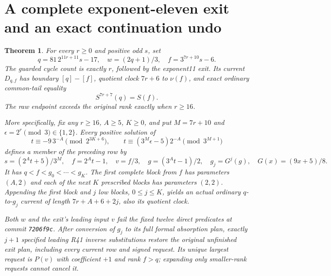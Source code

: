 \documentclass[11pt]{article}
\newtheorem{theorem}{Theorem}
\begin{document}
\section{A complete exponent-eleven exit and an exact continuation undo}
\begin{theorem}\label{thm:elevenexitundo}
For every $r\ge0$ and positive odd $s$, set
\[
 q=81\,2^{11r+11}s-17,\quad w=(2q+1)/3,
 \quad f=3^{7r+10}s-6.
\]
The guarded cycle count is exactly $r$, followed by the exponent11
exit. Its current $D_{q,f}$ has boundary $[q]-[f]$, quotient clock
$7r+6$ to $\nu(f)$, and exact ordinary common-tail equality
\[
 S^{7r+7}(q)=S(f).
\]
The raw endpoint exceeds the original rank exactly when $r\ge16$.

More specifically, fix any $r\ge16$, $A\ge5$, $K\ge0$, and
put $M=7r+10$ and $\epsilon=2^r\pmod3\in\{1,2\}$.
Every positive solution of
\[
 t\equiv-9\,3^{-A}\pmod{2^{3K+6}},\qquad
 t\equiv(3^M\epsilon-5)2^{-A}\pmod{3^{M+1}}
\]
defines a member of the preceding row by
\[
 s=(2^At+5)/3^M,\quad f=2^At-1,\quad v=f/3,
 \quad g=(3^At-1)/2,\quad g_j=G^j(g),\quad G(x)=(9x+5)/8.
\]
It has $q<f<g_0<\cdots<g_K$. The first complete block from $f$
has parameters $(A,2)$ and each of the next $K$ prescribed blocks
has parameters $(2,2)$. Appending the first block and $j$ low blocks,
$0\le j\le K$, yields an actual ordinary $q$-to-$g_j$ current of
length $7r+A+6+2j$, also its quotient clock.

Both $w$ and the exit's leading input $v$ fail the fixed twelve direct
predicates at commit \texttt{7206f9c}. After conversion of $g_j$
to its full formal absorption plan, exactly $j+1$ specified leading
R41 inverse substitutions restore the original unfinished exit plan,
including every current row and signed request. Its unique largest
request is $P(v)$ with coefficient $+1$ and rank $f>q$; expanding
only smaller-rank requests cannot cancel it.
\end{theorem}
\end{document}
